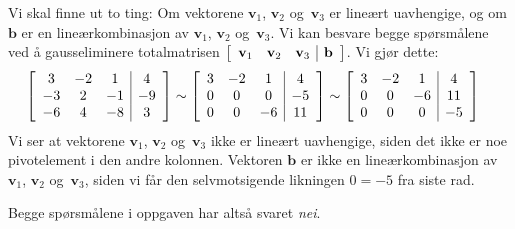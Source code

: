 \documentclass[notitlepage,a4paper,12pt,norsk]{IMFeksamen}
\newcommand{\roweq}{\sim}
\newcommand{\V}[1]{\mathbf{#1}}
\renewcommand{\v}{\V{v}}
\renewcommand{\b}{\V{b}}
\newcommand{\0}{\V{0}}
\newenvironment{amatrix}[1]{%
  \left[\begin{array}{*{#1}{c}|c}
}{%
  \end{array}\right]
}
\newcommand{\oppgslutt}{
\begin{center}
\pgfornament[width=6cm]{88}
\end{center}
}
\newenvironment{losning}{\begin{oppgave}}{\oppgslutt\end{oppgave}}
\begin{document}
\begin{losning}
Vi skal finne ut to ting:
Om vektorene $\v_1$, $\v_2$ og~$\v_3$ er lineært uavhengige,
og om $\b$ er en lineærkombinasjon av $\v_1$, $\v_2$ og~$\v_3$.
Vi kan besvare begge spørsmålene ved å gausseliminere totalmatrisen
$
\begin{amatrix}{3}
\v_1 & \v_2 & \v_3 & \b
\end{amatrix}
$.
Vi gjør dette:
\begin{align*}
\begin{amatrix}{3}
3 & -2 & 1 & 4 \\
-3 & 2 & -1 & -9 \\
-6 & 4 & -8 & 3
\end{amatrix}
&
\roweq
\begin{amatrix}{3}
3 & -2 & 1 & 4 \\
0 & 0 & 0 & -5 \\
0 & 0 & -6 & 11
\end{amatrix}
\roweq
\begin{amatrix}{3}
3 & -2 & 1 & 4 \\
0 & 0 & -6 & 11 \\
0 & 0 & 0 & -5
\end{amatrix}
\end{align*}
Vi ser at vektorene $\v_1$, $\v_2$ og~$\v_3$ ikke er lineært uavhengige,
siden det ikke er noe pivotelement i den andre kolonnen.
Vektoren $\b$ er ikke en lineærkombinasjon av $\v_1$, $\v_2$ og~$\v_3$,
siden vi får den selvmotsigende likningen $0 = -5$ fra siste rad.

Begge spørsmålene i oppgaven har altså svaret \emph{nei}.
\end{losning}
\end{document}
